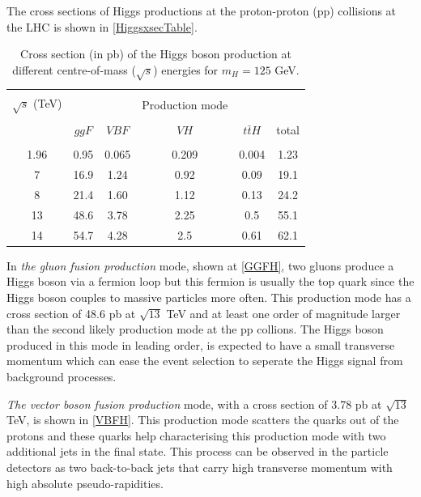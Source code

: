 The cross sections of Higgs productions at the proton-proton (pp) collisions at the LHC is shown in \autoref{HiggsxsecTable}.

\begin{table}[ht]
	{\setlength{\tabcolsep}{14pt}
		\caption{Cross section (in pb) of the Higgs boson production at different centre-of-mass ($\sqrt{s}$) energies for $m_H=125$ GeV.}
		\begin{center}
			\vspace{-6mm}
			\begin{tabular}{cccccc}
				\hline \\[-2.45ex] \hline \\[-2.1ex]
				$\sqrt{s}$ (TeV) &&&Production mode&&\\
				\hline \\[-1.8ex]
				& $ggF$ & $VBF$ & $VH$ & $t\bar tH$ & total \\
				\hline \\[-1.8ex]
                1.96 & 0.95 & 0.065 & 0.209 & 0.004 & 1.23 \\
                7 & 16.9 & 1.24 & 0.92 & 0.09 & 19.1 \\
                8 & 21.4 & 1.60 & 1.12 & 0.13 & 24.2 \\
                13 & 48.6 & 3.78 & 2.25 & 0.5 & 55.1 \\
                14 & 54.7 & 4.28 & 2.5 & 0.61 & 62.1 \\
				\hline
			\end{tabular}
			\vspace{-6mm}
		\end{center}
		\label{HiggsxsecTable}}
\end{table}

In \emph{the gluon fusion production} mode, shown at \autoref{GGFH}, two gluons produce a Higgs boson via a fermion loop but this fermion is usually the top quark since the Higgs boson couples to massive particles more often. This production mode has a cross section of 48.6 pb at $\sqrt{13}$ TeV and at least one order of magnitude larger than the second likely production mode at the pp collions. The Higgs boson produced in this mode in leading order, is expected to have a small transverse momentum which can ease the event selection to seperate the Higgs signal from background processes. 

\emph{The vector boson fusion production} mode, with a cross section of 3.78 pb at $\sqrt{13}$ TeV, is shown in \autoref{VBFH}. This production mode scatters the quarks out of the protons and these quarks help characterising this production mode with two additional jets in the final state. This process can be observed in the particle detectors as two back-to-back jets that carry high transverse momentum with high absolute pseudo-rapidities.

